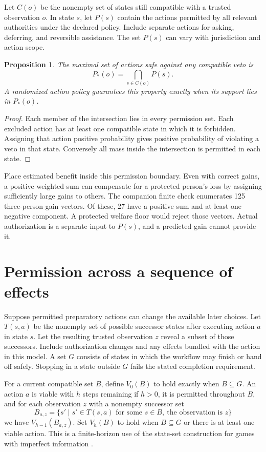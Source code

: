 \documentclass[11pt]{article}
\newtheorem{proposition}{Proposition}
\begin{document}
Let $C(o)$ be the nonempty set of states still compatible with a
trusted observation $o$. In state $s$, let $P(s)$ contain the actions
permitted by all relevant authorities under the declared policy.
Include separate actions for asking, deferring, and reversible
assistance. The set $P(s)$ can vary with jurisdiction and action scope.
\begin{proposition}
The maximal set of actions safe against any compatible veto is
\[
 P_*(o)=\bigcap_{s\in C(o)}P(s).
\]
A randomized action policy guarantees
this property exactly when its support lies in $P_*(o)$.
\end{proposition}
\begin{proof}
Each member of the intersection lies in every permission set. Each
excluded action has at least one compatible state in which it is
forbidden. Assigning that action positive probability gives positive
probability of violating a veto in that state. Conversely all mass
inside the intersection is permitted in each state.
\end{proof}

Place estimated benefit inside this permission boundary. Even
with correct gains, a positive weighted sum can compensate for
a protected person's loss by assigning sufficiently large gains
to others. The companion finite check enumerates 125 three-person
gain vectors. Of these, 27 have a positive sum and at least one
negative component. A protected welfare floor would reject those
vectors. Actual authorization is a separate input to $P(s)$,
and a predicted gain cannot provide it.

\section{Permission across a sequence of effects}
Suppose permitted preparatory actions can change the available
later choices. Let $T(s,a)$ be the nonempty set of possible
successor states after executing action $a$ in state $s$.
Let the resulting trusted observation $z$ reveal a subset of
those successors. Include authorization changes and any effects
bundled with the action in this model. A set $G$ consists of
states in which the workflow may finish or hand off safely.
Stopping in a state outside $G$ fails the stated completion
requirement.

For a current compatible set $B$, define $V_0(B)$ to hold
exactly when $B\subseteq G$. An action $a$ is viable with $h$
steps remaining if $h>0$, it is permitted throughout $B$, and
for each observation $z$ with a nonempty successor set
\[
B_{a,z}=\{s'\mid s'\in T(s,a)\text{ for some }s\in B,\ 
                       \text{the observation is }z\}
\]
we have $V_{h-1}(B_{a,z})$. Set $V_h(B)$ to hold when
$B\subseteq G$ or there is at least one viable action.
This is a finite-horizon use of the state-set construction
for games with imperfect information \cite{chatterjee}.
\end{document}
